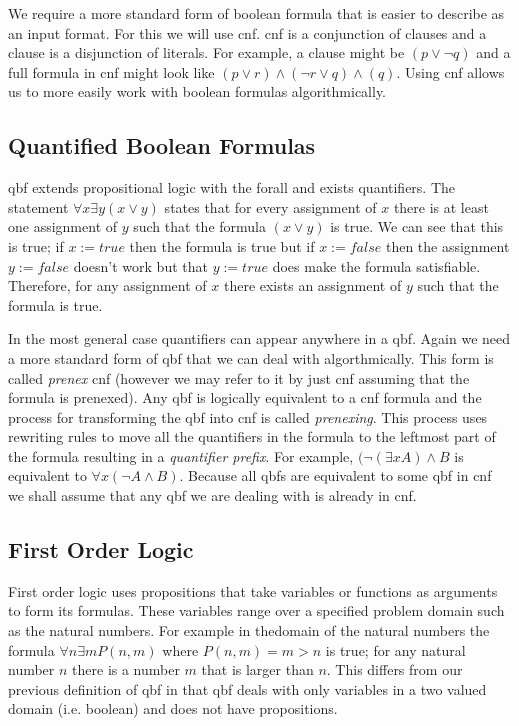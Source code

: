 We require a more standard form of boolean formula that is easier to describe as an input format. For this we will use \gls{cnf}. \Gls{cnf} is a conjunction of clauses and a clause is a disjunction of literals. For example, a clause might be $(p \lor \neg q)$ and a full formula in \gls{cnf} might look like $(p \lor r) \land (\neg r \lor q) \land (q)$. Using \gls{cnf} allows us to more easily work with boolean formulas algorithmically.

\subsection{Quantified Boolean Formulas}
\Gls{qbf} extends propositional logic with the \gls{forall} and \gls{exists} quantifiers. The statement $\forall x \exists y (x \lor y)$ states that for every assignment of $x$ there is at least one assignment of $y$ such that the formula $(x \lor y)$ is true. We can see that this is true; if $x := true$ then the formula is true but if $x := false$ then the assignment $y := false$ doesn't work but that $y := true$ does make the formula satisfiable. Therefore, for any assignment of $x$ there exists an assignment of $y$ such that the formula is true.

In the most general case quantifiers can appear anywhere in a \gls{qbf}. Again we need a more standard form of \gls{qbf} that we can deal with algorthmically. This form is called \textit{prenex} \gls{cnf} (however we may refer to it by just \gls{cnf} assuming that the formula is prenexed). Any \gls{qbf} is logically equivalent to a \gls{cnf} formula and the process for transforming the \gls{qbf} into \gls{cnf} is called \textit{prenexing}. This process uses rewriting rules to move all the quantifiers in the formula to the leftmost part of the formula resulting in a \textit{quantifier prefix}. For example, $(\neg (\exists x A) \land B$ is equivalent to $\forall x (\neg A \land B)$. Because all \glspl{qbf} are equivalent to some \gls{qbf} in \gls{cnf} we shall assume that any \gls{qbf} we are dealing with is already in \gls{cnf}.

\subsection{First Order Logic}
First order logic uses propositions that take variables or functions as arguments to form its formulas. These variables range over a specified problem domain such as the natural numbers. For example in thedomain of the natural numbers the formula $\forall n \exists m P(n, m)$ where $P(n, m) = m > n$ is true; for any natural number $n$ there is a number $m$ that is larger than $n$. This differs from our previous definition of \gls{qbf} in that \gls{qbf} deals with only variables in a two valued domain (i.e. boolean) and does not have propositions.

